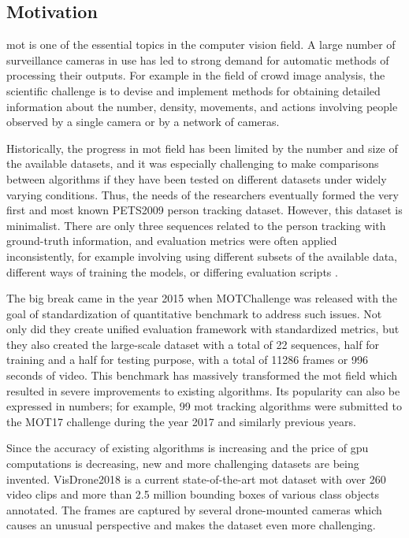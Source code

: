 \begin{introduction}
    \section{Motivation}
        \gls{mot} is one of the essential topics in the computer vision field. A large number of surveillance cameras in use has led to strong demand for automatic methods of processing their outputs. For example in the field of crowd image analysis, the scientific challenge is to devise and implement methods for obtaining detailed information about the number, density, movements, and actions involving people observed by a single camera or by a network of cameras.  
        
        Historically, the progress in \gls{mot} field has been limited by the number and size of the available datasets, and it was especially challenging to make comparisons between algorithms if they have been tested on different datasets under widely varying conditions. Thus, the needs of the researchers eventually formed the very first and most known PETS2009 \cite{ferryman2009pets2009} person tracking dataset. However, this dataset is minimalist. There are only three sequences related to the person tracking with ground-truth information, and evaluation metrics were often applied inconsistently, for example involving using different subsets of the available data, different ways of training the models, or differing evaluation scripts \cite{MOTChallenge2015}.
        
        The big break came in the year 2015 when MOTChallenge \cite{MOTChallenge2015} was released with the goal of standardization of quantitative benchmark to address such issues. Not only did they create unified evaluation framework with standardized metrics, but they also created the large-scale dataset with a total of 22 sequences, half for training and a half for testing purpose, with a total of 11286 frames or 996 seconds of video. This benchmark has massively transformed the \gls{mot} field which resulted in severe improvements to existing algorithms. Its popularity can also be expressed in numbers; for example, 99 \gls{mot} tracking algorithms were submitted to the MOT17 challenge \cite{mot16} during the year 2017 and similarly previous years. 
        
        Since the accuracy of existing algorithms is increasing and the price of \gls{gpu} computations is decreasing, new and more challenging datasets are being invented. VisDrone2018 \cite{zhuvisdrone2018} is a current state-of-the-art \gls{mot} dataset with over 260 video clips and more than 2.5 million bounding boxes of various class objects annotated. The frames are captured by several drone-mounted cameras which causes an unusual perspective and makes the dataset even more challenging. 
        

\end{introduction}
